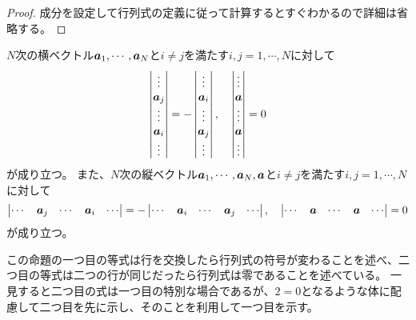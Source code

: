 \begin{proof}
成分を設定して行列式の定義に従って計算するとすぐわかるので詳細は省略する。
\end{proof}

\begin{proposition}[交代性]
$N$次の横ベクトル$\vb*{a}_1, \cdots, \vb*{a}_N$と$i \ne j$を満たす$i, j = 1, \cdots, N$に対して
$$
\begin{vmatrix}\vdots \\ \vb*{a}_j \\ \vdots \\ \vb*{a}_i \\ \vdots\end{vmatrix}
= -\begin{vmatrix}\vdots \\ \vb*{a}_i \\ \vdots \\ \vb*{a}_j \\ \vdots\end{vmatrix},
\quad \begin{vmatrix}\vdots \\ \vb*{a} \\ \vdots \\ \vb*{a} \\ \vdots\end{vmatrix} = 0
$$
が成り立つ。
また、$N$次の縦ベクトル$\vb*{a}_1, \cdots, \vb*{a}_N, \vb*{a}$と$i \ne j$を満たす$i, j = 1, \cdots, N$に対して
$$
\begin{vmatrix}\cdots & \vb*{a}_j & \cdots & \vb*{a}_i & \cdots\end{vmatrix}
= -\begin{vmatrix}\cdots & \vb*{a}_i & \cdots & \vb*{a}_j & \cdots\end{vmatrix},
\quad \begin{vmatrix}\cdots & \vb*{a} & \cdots & \vb*{a} & \cdots\end{vmatrix} = 0
$$
が成り立つ。
\end{proposition}

この命題の一つ目の等式は行を交換したら行列式の符号が変わることを述べ、二つ目の等式は二つの行が同じだったら行列式は零であることを述べている。
一見すると二つ目の式は一つ目の特別な場合であるが、$2 = 0$となるような体に配慮して二つ目を先に示し、そのことを利用して一つ目を示す。

